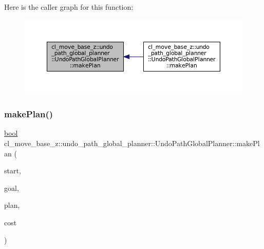 Here is the caller graph for this function\+:
\nopagebreak
\begin{figure}[H]
\begin{center}
\leavevmode
\includegraphics[width=350pt]{classcl__move__base__z_1_1undo__path__global__planner_1_1UndoPathGlobalPlanner_a46034d27c0811abae440009457a7f8b0_icgraph}
\end{center}
\end{figure}
\mbox{\label{classcl__move__base__z_1_1undo__path__global__planner_1_1UndoPathGlobalPlanner_aca09f640e4bda4d5ccc9613276fd3f71}} 
\subsubsection{\texorpdfstring{make\+Plan()}{makePlan()}\hspace{0.1cm}{\footnotesize\ttfamily [2/2]}}
{\footnotesize\ttfamily \hyperlink{classbool}{bool} cl\+\_\+move\+\_\+base\+\_\+z\+::undo\+\_\+path\+\_\+global\+\_\+planner\+::\+Undo\+Path\+Global\+Planner\+::make\+Plan (\begin{DoxyParamCaption}\item[{const geometry\+\_\+msgs\+::\+Pose\+Stamped \&}]{start,  }\item[{const geometry\+\_\+msgs\+::\+Pose\+Stamped \&}]{goal,  }\item[{std\+::vector$<$ geometry\+\_\+msgs\+::\+Pose\+Stamped $>$ \&}]{plan,  }\item[{double \&}]{cost }\end{DoxyParamCaption})}

